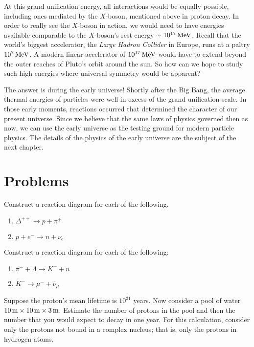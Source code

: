At this grand unification energy, all interactions would be equally
possible, including ones mediated by the $X$-boson, mentioned above in
proton decay.  In order to really see the $X$-boson in action, we
would need to have energies available comparable to the $X$-boson's
rest energy $\sim 10^{17}\,\mbox{MeV}$.  Recall that the world's biggest
accelerator, the {\it Large Hadron Collider} in Europe, runs at a 
paltry $10^7\,\mbox{MeV}$.  A modern linear
accelerator of $10^{17}\,\mbox{MeV}$ would have to extend beyond the outer
reaches of Pluto's orbit around the sun.  So how can we hope to study
such high energies where universal symmetry would be apparent?

The answer is during the early universe!  Shortly after the Big Bang,
the average thermal energies of particles were well in excess of the
grand unification scale.  In those early moments, reactions occurred
that determined the character of our present universe.  Since we
believe that the same laws of physics governed then as now, we can use
the early universe as the testing ground for modern particle physics.
The details of the physics of the early universe are the subject of
the next chapter.


\newpage

\section*{Problems}

\begin{problem}
Construct a reaction diagram for each of the following.
  \begin{enumerate}
  \item $\Delta^{++} \to p + \pi^+$
  \item $p + e^- \to n + \nu_e$
  \end{enumerate}
\label{prob:reaction_diagram_i}
\end{problem}

\begin{problem}
Construct a reaction diagram for each of the following:
  \begin{enumerate}
  \item $\pi^- + \Lambda \to K^- + n$
  \item $K^- \to \mu^- + \overline\nu_\mu$
  \end{enumerate}
\label{prob:reaction_diagram_ii}
\end{problem}

\begin{problem}
Suppose the proton's mean lifetime is
$10^{31}$ years.  Now consider a pool of water $10\,\mbox{m} \times
10\,\mbox{m} \times 3\,\mbox{m}$.  Estimate the number of protons in
the pool and then the number that you would expect to decay in one
year.  For this calculation, consider only the protons not bound in a
complex nucleus; that is, only the protons in hydrogen atoms. 
\label{prob:proton_decay} 
\end{problem}

